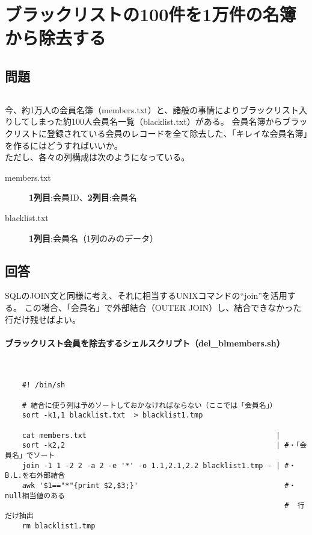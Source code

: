 \section{ブラックリストの100件を1万件の名簿から除去する}
\label{recipe:blacklist}

\subsection*{問題}
\noindent
$\!\!\!\!\!$
\begin{grshfboxit}{160.0mm}
	今、約1万人の会員名簿（members.txt）と、諸般の事情によりブラックリスト入りしてしまった約100人会員名一覧（blacklist.txt）がある。
	会員名簿からブラックリストに登録されている会員のレコードを全て除去した、「キレイな会員名簿」を作るにはどうすればいいか。 \\
	ただし、各々の列構成は次のようになっている。
	\begin{description}
	  \item[members.txt] \textbf{1列目}:会員ID、\textbf{2列目}:会員名
	  \item[blacklist.txt ] \textbf{1列目}:会員名（1列のみのデータ）
	\end{description}
\end{grshfboxit}

\subsection*{回答}
SQLのJOIN文と同様に考え、それに相当するUNIXコマンドの``join''を活用する。
この場合、「会員名」で外部結合（OUTER JOIN）し、結合できなかった行だけ残せばよい。

\paragraph{ブラックリスト会員を除去するシェルスクリプト（del\_{}blmembers.sh）} 　\\
\begin{frameboxit}{160.0mm}
\begin{verbatim}
	#! /bin/sh

	# 結合に使う列は予めソートしておかなければならない（ここでは「会員名」）
	sort -k1,1 blacklist.txt  > blacklist1.tmp

	cat members.txt                                            |
	sort -k2,2                                                 | #・「会員名」でソート
	join -1 1 -2 2 -a 2 -e '*' -o 1.1,2.1,2.2 blacklist1.tmp - | #・B.L.を右外部結合
	awk '$1=="*"{print $2,$3;}'                                  #・null相当値のある
	                                                             #  行だけ抽出
	rm blacklist1.tmp
\end{verbatim}
\end{frameboxit}


